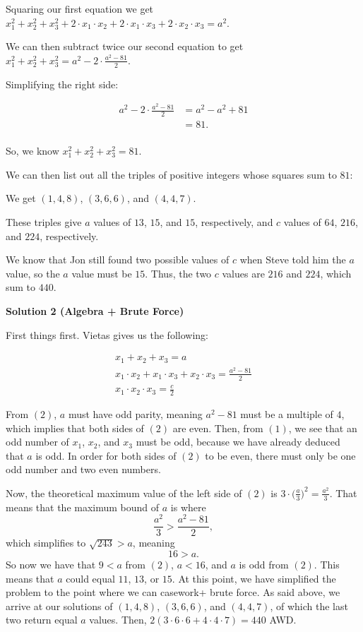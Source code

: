\begin{enumerate}
 Squaring our first equation we get $x_1^2+x_2^2+x_3^2+2 \cdot x_1 \cdot x_2+2 \cdot x_1 \cdot x_3+2 \cdot x_2 \cdot x_3 = a^2$.

 We can then subtract twice our second equation to get $x_1^2+x_2^2+x_3^2 = a^2-2 \cdot \frac{a^2-81}{2}$.

 Simplifying the right side:

 

 \begin{align*} a^2-2 \cdot \frac{a^2-81}{2} &= a^2-a^2+81\\ &= 81.\\ \end{align*}


 So, we know $x_1^2+x_2^2+x_3^2 = 81$.

 We can then list out all the triples of positive integers whose squares sum to $81$:

 We get $(1, 4, 8)$, $(3, 6, 6)$, and $(4, 4, 7)$.  

 These triples give $a$ values of $13$, $15$, and $15$, respectively, and $c$ values of $64$, $216$, and $224$, respectively.  

 We know that Jon still found two possible values of $c$ when Steve told him the $a$ value, so the $a$ value must be $15$.  Thus, the two $c$ values are $216$ and $224$, which sum to $\boxed{\text{440}}$.

 



\textbf{Solution 2 (Algebra + Brute Force)}

First things first. Vietas gives us the following:

 
 \begin{align} x_1+x_2+x_3 = a\\ x_1 \cdot x_2+x_1 \cdot x_3+x_2 \cdot x_3 = \frac{a^2-81}{2}\\ x_1 \cdot x_2 \cdot x_3 = \frac{c}{2} \end{align}

 From $(2)$, $a$ must have odd parity, meaning $a^2-81$ must be a multiple of $4$, which implies that both sides of $(2)$ are even. Then, from $(1)$, we see that an odd number of $x_1$, $x_2$, and $x_3$ must be odd, because we have already deduced that $a$ is odd. In order for both sides of $(2)$ to be even, there must only be one odd number and two even numbers.

 Now, the theoretical maximum value of the left side of $(2)$ is $3 \cdot \biggl(\frac{a}{3}\biggr)^2=\frac{a^2}{3}$. That means that the maximum bound of $a$ is where
 \[\frac{a^2}{3} > \frac{a^2-81}{2},\]which simplifies to $\sqrt{243} > a$, meaning
 \[16 > a.\]So now we have that $9<a$ from $(2)$, $a<16$, and $a$ is odd from $(2)$. This means that $a$ could equal $11$, $13$, or $15$. At this point, we have simplified the problem to the point where we can casework+ brute force. As said above, we arrive at our solutions of  $(1, 4, 8)$, $(3, 6, 6)$, and $(4, 4, 7)$, of which the last two return equal $a$ values. Then, $2(3 \cdot 6 \cdot 6+4 \cdot 4 \cdot 7)=\boxed{440}$ AWD.


\end{enumerate}
